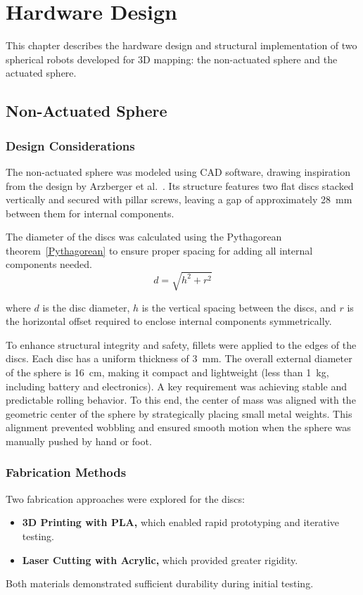 \documentclass[english, bachelor, utf8]{base/thesis_telematics}
\begin{document}
\chapter{Hardware Design}
\label{ch:hardwaredesign}

This chapter describes the hardware design and structural implementation of two spherical robots developed for 3D mapping: the non-actuated sphere and the actuated sphere.

\section{Non-Actuated Sphere}
\subsection{Design Considerations}

The non-actuated sphere was modeled using CAD software, drawing inspiration from the design by Arzberger et al.~\cite{Kalman_filter_sphere}.
Its structure features two flat discs stacked vertically and secured with pillar screws, leaving a gap of approximately \SI{28}{\milli\meter} between them for internal components. 

The diameter of the discs was calculated using the Pythagorean theorem~\ref{Pythagorean} to ensure proper spacing for adding all internal components needed.
\begin{equation}
    d = \sqrt{h^2 + r^2} \label{Pythagorean}
\end{equation}


\noindent
where $d$ is the disc diameter, $h$ is the vertical spacing between the discs, and $r$ is the horizontal offset required to enclose internal components symmetrically.

To enhance structural integrity and safety, fillets were applied to the edges of the discs. 
Each disc has a uniform thickness of \SI{3}{\milli\meter}.
The overall external diameter of the sphere is \SI{16}{\centi\meter}, making it compact and lightweight (less than \SI{1}{\kilo\gram}, including battery and electronics).
A key requirement was achieving stable and predictable rolling behavior. 
To this end, the center of mass was aligned with the geometric center of the sphere by strategically placing small metal weights. 
This alignment prevented wobbling and ensured smooth motion when the sphere was manually pushed by hand or foot.

\subsection{Fabrication Methods}
Two fabrication approaches were explored for the discs:
\begin{itemize}
    \item \textbf{3D Printing with PLA,} which enabled rapid prototyping and iterative testing.
    \item \textbf{Laser Cutting with Acrylic,} which provided greater rigidity.
\end{itemize}
Both materials demonstrated sufficient durability during initial testing.
\end{document}
